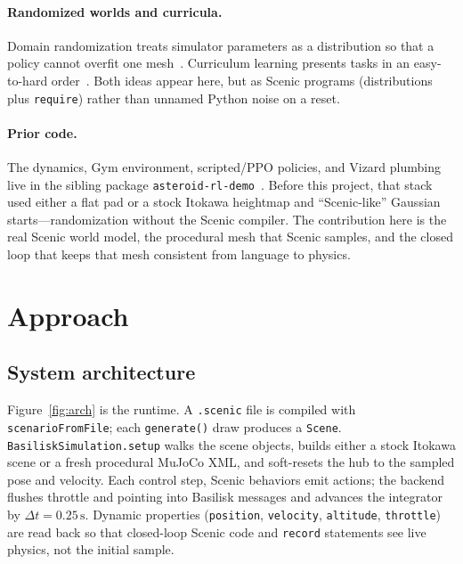 \documentclass[10pt]{article}
\begin{document}
\paragraph{Randomized worlds and curricula.}
Domain randomization treats simulator parameters as a distribution so that a policy cannot overfit one mesh~\citep{tobin2017domain}.
Curriculum learning presents tasks in an easy-to-hard order~\citep{bengio2009curriculum}.
Both ideas appear here, but as Scenic programs (distributions plus \texttt{require}) rather than unnamed Python noise on a reset.

\paragraph{Prior code.}
The dynamics, Gym environment, scripted/PPO policies, and Vizard plumbing live in the sibling package \texttt{asteroid-rl-demo}~\citep{asteroidrldemo}.
Before this project, that stack used either a flat pad or a stock Itokawa heightmap and ``Scenic-like'' Gaussian starts---randomization without the Scenic compiler.
The contribution here is the real Scenic world model, the procedural mesh that Scenic samples, and the closed loop that keeps that mesh consistent from language to physics.

\section{Approach}
\label{sec:approach}

\subsection{System architecture}

Figure~\ref{fig:arch} is the runtime.
A \texttt{.scenic} file is compiled with \texttt{scenarioFromFile}; each \texttt{generate()} draw produces a \texttt{Scene}.
\texttt{BasiliskSimulation.setup} walks the scene objects, builds either a stock Itokawa scene or a fresh procedural MuJoCo XML, and soft-resets the hub to the sampled pose and velocity.
Each control step, Scenic behaviors emit actions; the backend flushes throttle and pointing into Basilisk messages and advances the integrator by $\Delta t = 0.25\,\mathrm{s}$.
Dynamic properties (\texttt{position}, \texttt{velocity}, \texttt{altitude}, \texttt{throttle}) are read back so that closed-loop Scenic code and \texttt{record} statements see live physics, not the initial sample.
\end{document}
